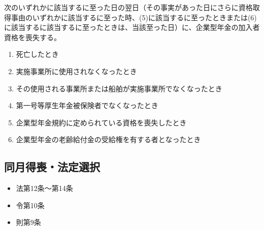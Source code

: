 \begin{answerbox}
  次のいずれかに該当するに至った日の翌日（その事実があった日にさらに資格取得事由のいずれかに該当するに至った時、(5)に該当するに至ったときまたは(6)に該当するに該当するに至ったときは、当該至った日）に、企業型年金の加入者資格を喪失する。
  \begin{enumerate}[(1)]
    \item 死亡したとき
    \item 実施事業所に使用されなくなったとき
    \item その使用される事業所または船舶が実施事業所でなくなったとき
    \item 第一号等厚生年金被保険者でなくなったとき
    \item 企業型年金規約に定められている資格を喪失したとき
    \item 企業型年金の老齢給付金の受給権を有する者となったとき
  \end{enumerate}
\end{answerbox}

\newpage

\subsection{同月得喪・法定選択}

\begin{InyouJobunbox}
  \begin{itemize}
    \item 法第12条〜第14条
    \item 令第10条
    \item 則第9条
  \end{itemize}
\end{InyouJobunbox}

